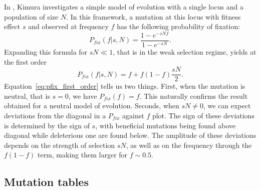 \documentclass[reprint,amsmath,amssymb,superscriptaddress,showpacs,rmp]{revtex4-1}
\begin{document}
In \citep{kimura_diffusion_1964}, Kimura investigates a simple model of evolution with a single locus and a population of size $N$.
In this framework, a mutation at this locus with fitness effect $s$ and observed at frequency $f$ has the following probability of fixation:
\begin{equation}
    P_{fix}(f\vert s,N) = \frac{1-e^{-sNf}}{1-e^{-sN}}.
\end{equation}
Expanding this formula for $sN\ll 1$, that is in the weak selection regime, yields at the first order
\begin{equation}
    P_{fix}(f\vert s,N) = f + f(1-f)\frac{sN}{2}.
    \label{eq:pfix_first_order}
\end{equation}
Equation~\ref{eq:pfix_first_order} tells us two things. First, when the mutation is neutral, that is $s=0$, we have $P_{fix}(f) = f$.
This naturally confirms the result obtained for a neutral model of evolution.
Seconds, when $sN\neq 0$, we can expect deviations from the diagonal in a $P_{fix}$ against $f$ plot.
The sign of these deviations is determined by the sign of $s$, with beneficial mutations being found above diagonal while deleterious one are found below.
The amplitude of these deviations depends on the strength of selection $sN$, as well as on the frequency through the $f(1-f)$ term, making them larger for $f\sim 0.5$.




\newpage
\subsection{Mutation tables}
\end{document}

